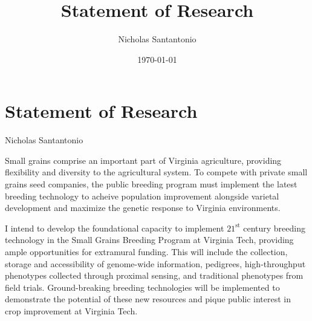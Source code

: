 \documentclass[11pt]{article}
\title{Statement of Research}
\author{Nicholas Santantonio}
\date{\today}
\begin{document}
\section*{\centering Statement of Research}
\begin{center} Nicholas Santantonio \end{center}







\noindent Small grains comprise an important part of Virginia agriculture, providing flexibility and diversity to the agricultural system. To compete with private small grains seed companies, the public breeding program must implement the latest breeding technology to acheive population improvement alongside varietal development and maximize the genetic response to Virginia environments. 



I intend to develop the foundational capacity to implement $21^\text{st}$ century breeding technology in the Small Grains Breeding Program at Virginia Tech, providing ample opportunities for extramural funding. This will include the collection, storage and accessibility of genome-wide information, pedigrees, high-throughput phenotypes collected through proximal sensing, and traditional phenotypes from field trials. Ground-breaking breeding technologies will be implemented to demonstrate the potential of these new resources and pique public interest in crop improvement at Virginia Tech.  
\end{document}
